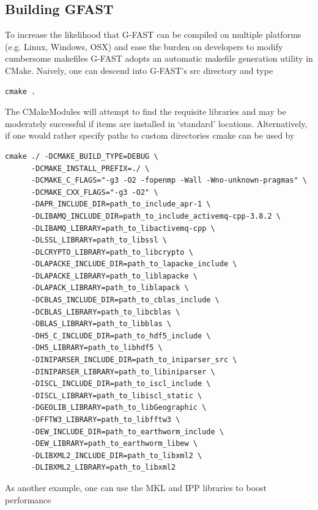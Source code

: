 \documentclass[12pt]{article}
\begin{document}
\subsection{Building GFAST}

To increase the likelihood that G-FAST can be compiled on multiple platforms (e.g. Linux, 
Windows, OSX) and ease the burden on developers to modify cumbersome makefiles G-FAST 
adopts an automatic makefile generation utility in CMake.  Naively, one can descend 
into G-FAST's src directory and type 
\begin{verbatim}
cmake .
\end{verbatim}  
The CMakeModules will attempt to find the requisite libraries and may be moderately successful
if items are installed in `standard'
locations.  Alternatively, if one would rather specify paths to custom directories
cmake can be used by  
\begin{verbatim}
cmake ./ -DCMAKE_BUILD_TYPE=DEBUG \
      -DCMAKE_INSTALL_PREFIX=./ \
      -DCMAKE_C_FLAGS="-g3 -O2 -fopenmp -Wall -Wno-unknown-pragmas" \
      -DCMAKE_CXX_FLAGS="-g3 -O2" \
      -DAPR_INCLUDE_DIR=path_to_include_apr-1 \
      -DLIBAMQ_INCLUDE_DIR=path_to_include_activemq-cpp-3.8.2 \
      -DLIBAMQ_LIBRARY=path_to_libactivemq-cpp \
      -DLSSL_LIBRARY=path_to_libssl \
      -DLCRYPTO_LIBRARY=path_to_libcrypto \
      -DLAPACKE_INCLUDE_DIR=path_to_lapacke_include \
      -DLAPACKE_LIBRARY=path_to_liblapacke \
      -DLAPACK_LIBRARY=path_to_liblapack \
      -DCBLAS_INCLUDE_DIR=path_to_cblas_include \
      -DCBLAS_LIBRARY=path_to_libcblas \
      -DBLAS_LIBRARY=path_to_libblas \
      -DH5_C_INCLUDE_DIR=path_to_hdf5_include \
      -DH5_LIBRARY=path_to_libhdf5 \
      -DINIPARSER_INCLUDE_DIR=path_to_iniparser_src \
      -DINIPARSER_LIBRARY=path_to_libiniparser \
      -DISCL_INCLUDE_DIR=path_to_iscl_include \
      -DISCL_LIBRARY=path_to_libiscl_static \
      -DGEOLIB_LIBRARY=path_to_libGeographic \
      -DFFTW3_LIBRARY=path_to_libfftw3 \
      -DEW_INCLUDE_DIR=path_to_earthworm_include \
      -DEW_LIBRARY=path_to_earthworm_libew \
      -DLIBXML2_INCLUDE_DIR=path_to_libxml2 \
      -DLIBXML2_LIBRARY=path_to_libxml2
\end{verbatim}
As another example, one can use the MKL and IPP libraries to boost performance 
\end{document}

